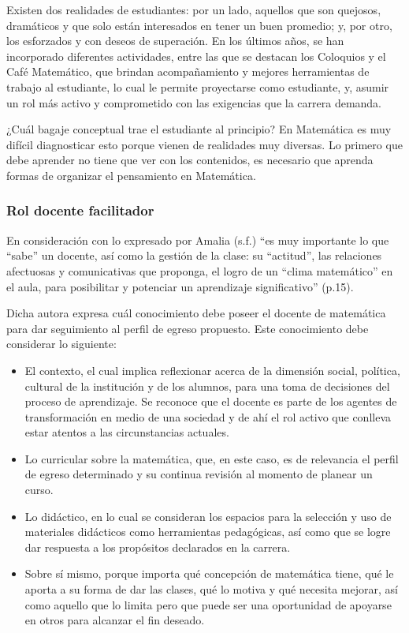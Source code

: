 Existen dos realidades de estudiantes: por un lado, aquellos que son quejosos, dramáticos y que solo están interesados en tener un buen promedio; y, por otro, los esforzados y con deseos de superación. En los últimos años, se han incorporado diferentes actividades, entre las que se destacan los Coloquios y el Café Matemático, que brindan acompañamiento y mejores herramientas de trabajo al estudiante, lo cual le permite proyectarse como estudiante, y, asumir un rol más activo y comprometido con las exigencias que la carrera demanda. 

¿Cuál bagaje conceptual trae el estudiante al principio? En Matemática es muy difícil diagnosticar esto porque vienen de realidades muy diversas. Lo primero que debe aprender no tiene que ver con los contenidos, es necesario que aprenda formas de organizar el pensamiento en Matemática. 

\subsubsection*{Rol docente facilitador}

En consideración con lo expresado por Amalia (s.f.) “es muy importante lo que “sabe” un docente, así como la gestión de la clase: su “actitud”, las relaciones afectuosas y comunicativas que proponga, el logro de un “clima matemático” en el aula, para posibilitar y potenciar un aprendizaje significativo” (p.15). 

Dicha autora expresa cuál conocimiento debe poseer el docente de matemática para dar seguimiento al perfil de egreso propuesto. Este conocimiento debe considerar lo siguiente: 

\begin{itemize}
    
    \color{blue} \item \color{black} El contexto, el cual implica reflexionar acerca de la dimensión social, política, cultural de la institución y de los alumnos, para una toma de decisiones del proceso de aprendizaje. Se reconoce que el docente es parte de los agentes de transformación en medio de una sociedad y de ahí el rol activo que conlleva estar atentos a las circunstancias actuales. 

     \color{blue} \item \color{black} Lo curricular sobre la matemática, que, en este caso, es de relevancia el perfil de egreso determinado y su continua revisión al momento de planear un curso. 
     
    \color{blue} \item \color{black} Lo didáctico, en lo cual se consideran los espacios para la selección y uso de materiales didácticos como herramientas pedagógicas, así como que se logre dar respuesta a los propósitos declarados en la carrera. 
    
    \color{blue} \item \color{black} Sobre sí mismo, porque importa qué concepción de matemática tiene, qué le aporta a su forma de dar las clases, qué lo motiva y qué necesita mejorar, así como aquello que lo limita pero que puede ser una oportunidad de apoyarse en otros para alcanzar el fin deseado.
    \end{itemize}
    
